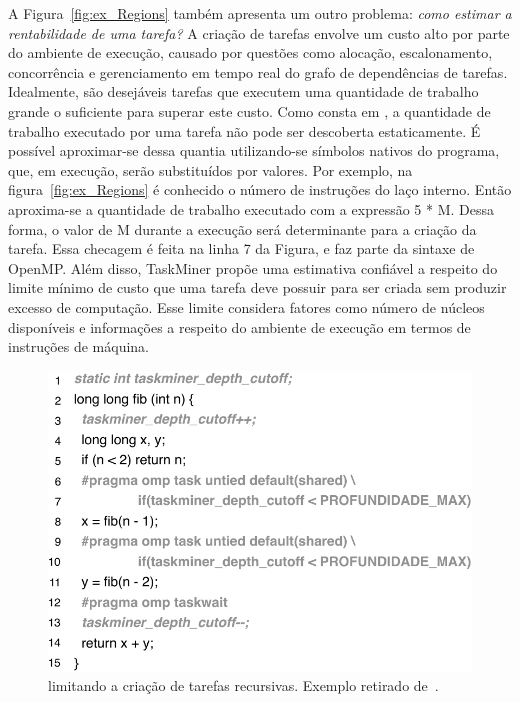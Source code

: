 \documentclass[sigplan,10pt,review]{acmart}
\newcommand\Taskminer{\mbox{\textsf{TaskMiner}}}
\begin{document}
A Figura~\ref{fig:ex_Regions} também apresenta um outro problema: {\em como estimar a rentabilidade de uma tarefa?}
A criação de tarefas envolve um custo alto por parte do ambiente de execução, causado por questões como
alocação, escalonamento, concorrência e gerenciamento em tempo real do grafo de dependências de tarefas.
Idealmente, são desejáveis tarefas que executem uma quantidade de trabalho
grande o suficiente para superar este custo. Como consta em \cite{Rice53}, a quantidade de trabalho executado
por uma tarefa não pode ser descoberta estaticamente. É possível aproximar-se dessa quantia utilizando-se
símbolos nativos do programa, que, em execução, serão substituídos por valores. 
Por exemplo, na figura~\ref{fig:ex_Regions}
é conhecido o número de instruções do laço interno. Então aproxima-se a quantidade de trabalho executado
com a expressão \textsf{5 * M}. Dessa forma, o valor de \textsf{M} durante a execução será determinante para
a criação da tarefa. Essa checagem é feita na linha 7 da Figura, 
e faz parte da sintaxe de OpenMP. Além disso, {\Taskminer} propõe
uma estimativa confiável a respeito do limite mínimo de custo 
que uma tarefa deve possuir para ser criada sem produzir
excesso de computação. Esse limite considera fatores como número de 
núcleos disponíveis e informações a respeito do ambiente
de execução em termos de instruções de máquina.
	
\begin{figure}[h!]
\begin{center}
\includegraphics[width=1\columnwidth]{images/ex_cutoff}
\caption{limitando a criação de tarefas recursivas.
Exemplo retirado de~\cite[Fig.1]{Iwasaki16}.}
\label{fig:ex_cutoff}
\end{center}
\end{figure}
	
\end{document}
